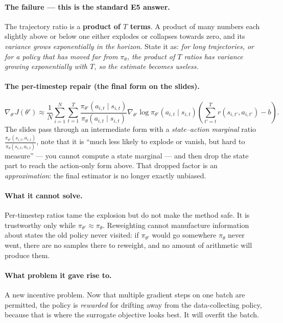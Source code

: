 \documentclass[11pt,a4paper]{article}
\begin{document}
\paragraph{The failure --- this is the standard E5 answer.} The trajectory
ratio is a \textbf{product of $T$ terms}. A product of many numbers each
slightly above or below one either explodes or collapses towards zero, and its
\emph{variance grows exponentially in the horizon}. State it as: \emph{for
long trajectories, or for a policy that has moved far from $\pi_\theta$, the
product of $T$ ratios has variance growing exponentially with $T$, so the
estimate becomes useless.}

\paragraph{The per-timestep repair (the final form on the slides).}
\[
\nabla_{\theta'}J(\theta')\approx
\frac1N\sum_{i=1}^N\sum_{t=1}^{T}
\frac{\pi_{\theta'}(a_{i,t}\mid s_{i,t})}{\pi_\theta(a_{i,t}\mid s_{i,t})}
\nabla_{\theta'}\log\pi_{\theta'}(a_{i,t}\mid s_{i,t})
\left(\sum_{t'=t}^{T} r(s_{i,t'},a_{i,t'})-b\right).
\]
The slides pass through an intermediate form with a \emph{state--action
marginal} ratio $\tfrac{\pi_{\theta'}(s_{i,t},a_{i,t})}{\pi_\theta(s_{i,t},a_{i,t})}$,
note that it is ``much less likely to explode or vanish, but hard to
measure'' --- you cannot compute a state marginal --- and then drop the state
part to reach the action-only form above. That dropped factor is an
\emph{approximation}: the final estimator is no longer exactly unbiased.

\paragraph{What it cannot solve.} Per-timestep ratios tame the explosion but do
not make the method safe. It is trustworthy only while
$\pi_{\theta'}\approx\pi_\theta$. Reweighting cannot manufacture information
about states the old policy never visited: if $\pi_{\theta'}$ would go
somewhere $\pi_\theta$ never went, there are no samples there to reweight, and
no amount of arithmetic will produce them.

\paragraph{What problem it gave rise to.} A new incentive problem. Now that
multiple gradient steps on one batch are permitted, the policy is
\emph{rewarded} for drifting away from the data-collecting policy, because
that is where the surrogate objective looks best. It will overfit the batch.
\end{document}
